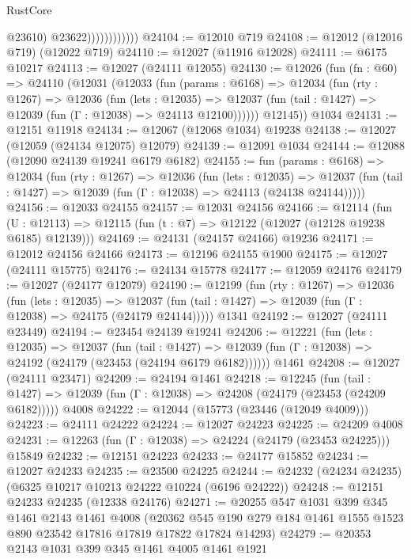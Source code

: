 \begin{lexlean}{RustCore}
\begin{coremodule}
                              @23610)
                            @23622))))))))))))
@24104 := @12010 @719
@24108 := @12012 (@12016 @719) (@12022 @719)
@24110 := @12027 (@11916 @12028)
@24111 := @6175 @10217
@24113 := @12027 (@24111 @12055)
@24130 := @12026
    (fun (fn : @60) =>
    @24110
      (@12031
        (@12033
          (fun (params : @6168) =>
          @12034
            (fun (rty : @1267) =>
            @12036
              (fun (lets : @12035) =>
              @12037 (fun (tail : @1427) => @12039 (fun (Γ : @12038) => @24113 @12100))))))
        @12145))
    @1034
@24131 := @12151 @11918
@24134 := @12067 (@12068 @1034) @19238
@24138 := @12027 (@12059 (@24134 @12075) @12079)
@24139 := @12091 @1034
@24144 := @12088 (@12090 @24139 @19241 @6179 @6182)
@24155 := fun (params : @6168) =>
  @12034
    (fun (rty : @1267) =>
    @12036
      (fun (lets : @12035) =>
      @12037 (fun (tail : @1427) => @12039 (fun (Γ : @12038) => @24113 (@24138 @24144)))))
@24156 := @12033 @24155
@24157 := @12031 @24156
@24166 := @12114
    (fun (U : @12113) => @12115 (fun (t : @7) => @12122 (@12027 (@12128 @19238 @6185) @12139)))
@24169 := @24131 (@24157 @24166) @19236
@24171 := @12012 @24156 @24166
@24173 := @12196 @24155 @1900
@24175 := @12027 (@24111 @15775)
@24176 := @24134 @15778
@24177 := @12059 @24176
@24179 := @12027 (@24177 @12079)
@24190 := @12199
    (fun (rty : @1267) =>
    @12036
      (fun (lets : @12035) =>
      @12037 (fun (tail : @1427) => @12039 (fun (Γ : @12038) => @24175 (@24179 @24144)))))
    @1341
@24192 := @12027 (@24111 @23449)
@24194 := @23454 @24139 @19241
@24206 := @12221
    (fun (lets : @12035) =>
    @12037
      (fun (tail : @1427) =>
      @12039 (fun (Γ : @12038) => @24192 (@24179 (@23453 (@24194 @6179 @6182))))))
    @1461
@24208 := @12027 (@24111 @23471)
@24209 := @24194 @1461
@24218 := @12245
    (fun (tail : @1427) => @12039 (fun (Γ : @12038) => @24208 (@24179 (@23453 (@24209 @6182)))))
    @4008
@24222 := @12044 (@15773 (@23446 (@12049 @4009)))
@24223 := @24111 @24222
@24224 := @12027 @24223
@24225 := @24209 @4008
@24231 := @12263 (fun (Γ : @12038) => @24224 (@24179 (@23453 @24225))) @15849
@24232 := @12151 @24223
@24233 := @24177 @15852
@24234 := @12027 @24233
@24235 := @23500 @24225
@24244 := @24232 (@24234 @24235) (@6325 @10217 @10213 @24222 @10224 (@6196 @24222))
@24248 := @12151 @24233 @24235 (@12338 @24176)
@24271 := @20255
    @547
    @1031
    @399
    @345
    @1461
    @2143
    @1461
    @4008
    (@20362 @545 @190 @279 @184 @1461 @1555 @1523 @890 @23542 @17816 @17819 @17822 @17824 @14293)
@24279 := @20353 @2143 @1031 @399 @345 @1461 @4005 @1461 @1921

\end{coremodule}
\end{lexlean}
